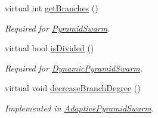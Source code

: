 \begin{CompactItemize}
virtual int \hyperlink{classSwarm_c248592977868472b6874016ad273dbb}{getBranches} ()
\begin{CompactList}\small\item\em Required for \hyperlink{classPyramidSwarm}{PyramidSwarm}. \item\end{CompactList}\item 
virtual bool \hyperlink{classSwarm_75d0b85dc6fa2ec069f1580e0386faee}{isDivided} ()
\begin{CompactList}\small\item\em Required for \hyperlink{classDynamicPyramidSwarm}{DynamicPyramidSwarm}. \item\end{CompactList}\item 
virtual void \hyperlink{classSwarm_be7aff8e0df635ac00082fd6cd418356}{decreaseBranchDegree} ()
\begin{CompactList}\small\item\em Implemented in \hyperlink{classAdaptivePyramidSwarm}{AdaptivePyramidSwarm}. \item\end{CompactList}\end{CompactItemize}
